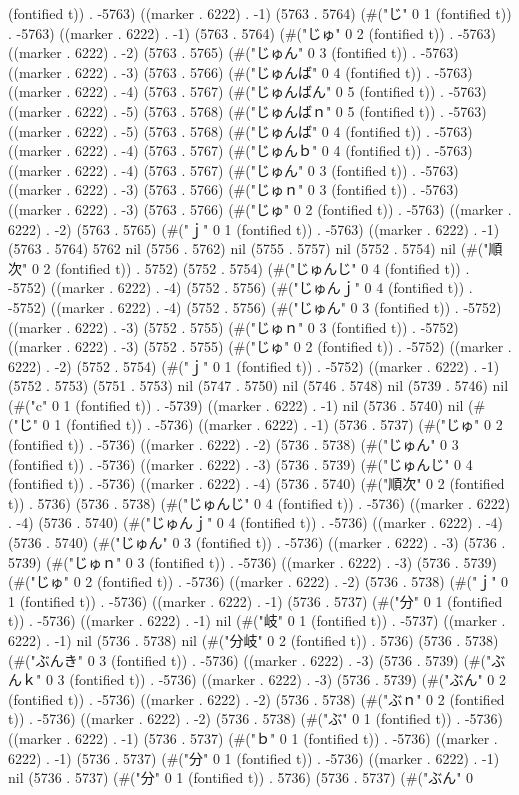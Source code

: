 {(fontified t)) . -5763) ((marker . 6222) . -1) (5763 . 5764) (#("じ" 0 1 (fontified t)) . -5763) ((marker . 6222) . -1) (5763 . 5764) (#("じゅ" 0 2 (fontified t)) . -5763) ((marker . 6222) . -2) (5763 . 5765) (#("じゅん" 0 3 (fontified t)) . -5763) ((marker . 6222) . -3) (5763 . 5766) (#("じゅんば" 0 4 (fontified t)) . -5763) ((marker . 6222) . -4) (5763 . 5767) (#("じゅんばん" 0 5 (fontified t)) . -5763) ((marker . 6222) . -5) (5763 . 5768) (#("じゅんばｎ" 0 5 (fontified t)) . -5763) ((marker . 6222) . -5) (5763 . 5768) (#("じゅんば" 0 4 (fontified t)) . -5763) ((marker . 6222) . -4) (5763 . 5767) (#("じゅんｂ" 0 4 (fontified t)) . -5763) ((marker . 6222) . -4) (5763 . 5767) (#("じゅん" 0 3 (fontified t)) . -5763) ((marker . 6222) . -3) (5763 . 5766) (#("じゅｎ" 0 3 (fontified t)) . -5763) ((marker . 6222) . -3) (5763 . 5766) (#("じゅ" 0 2 (fontified t)) . -5763) ((marker . 6222) . -2) (5763 . 5765) (#("ｊ" 0 1 (fontified t)) . -5763) ((marker . 6222) . -1) (5763 . 5764) 5762 nil (5756 . 5762) nil (5755 . 5757) nil (5752 . 5754) nil (#("順次" 0 2 (fontified t)) . 5752) (5752 . 5754) (#("じゅんじ" 0 4 (fontified t)) . -5752) ((marker . 6222) . -4) (5752 . 5756) (#("じゅんｊ" 0 4 (fontified t)) . -5752) ((marker . 6222) . -4) (5752 . 5756) (#("じゅん" 0 3 (fontified t)) . -5752) ((marker . 6222) . -3) (5752 . 5755) (#("じゅｎ" 0 3 (fontified t)) . -5752) ((marker . 6222) . -3) (5752 . 5755) (#("じゅ" 0 2 (fontified t)) . -5752) ((marker . 6222) . -2) (5752 . 5754) (#("ｊ" 0 1 (fontified t)) . -5752) ((marker . 6222) . -1) (5752 . 5753) (5751 . 5753) nil (5747 . 5750) nil (5746 . 5748) nil (5739 . 5746) nil (#("c" 0 1 (fontified t)) . -5739) ((marker . 6222) . -1) nil (5736 . 5740) nil (#("じ" 0 1 (fontified t)) . -5736) ((marker . 6222) . -1) (5736 . 5737) (#("じゅ" 0 2 (fontified t)) . -5736) ((marker . 6222) . -2) (5736 . 5738) (#("じゅん" 0 3 (fontified t)) . -5736) ((marker . 6222) . -3) (5736 . 5739) (#("じゅんじ" 0 4 (fontified t)) . -5736) ((marker . 6222) . -4) (5736 . 5740) (#("順次" 0 2 (fontified t)) . 5736) (5736 . 5738) (#("じゅんじ" 0 4 (fontified t)) . -5736) ((marker . 6222) . -4) (5736 . 5740) (#("じゅんｊ" 0 4 (fontified t)) . -5736) ((marker . 6222) . -4) (5736 . 5740) (#("じゅん" 0 3 (fontified t)) . -5736) ((marker . 6222) . -3) (5736 . 5739) (#("じゅｎ" 0 3 (fontified t)) . -5736) ((marker . 6222) . -3) (5736 . 5739) (#("じゅ" 0 2 (fontified t)) . -5736) ((marker . 6222) . -2) (5736 . 5738) (#("ｊ" 0 1 (fontified t)) . -5736) ((marker . 6222) . -1) (5736 . 5737) (#("分" 0 1 (fontified t)) . -5736) ((marker . 6222) . -1) nil (#("岐" 0 1 (fontified t)) . -5737) ((marker . 6222) . -1) nil (5736 . 5738) nil (#("分岐" 0 2 (fontified t)) . 5736) (5736 . 5738) (#("ぶんき" 0 3 (fontified t)) . -5736) ((marker . 6222) . -3) (5736 . 5739) (#("ぶんｋ" 0 3 (fontified t)) . -5736) ((marker . 6222) . -3) (5736 . 5739) (#("ぶん" 0 2 (fontified t)) . -5736) ((marker . 6222) . -2) (5736 . 5738) (#("ぶｎ" 0 2 (fontified t)) . -5736) ((marker . 6222) . -2) (5736 . 5738) (#("ぶ" 0 1 (fontified t)) . -5736) ((marker . 6222) . -1) (5736 . 5737) (#("ｂ" 0 1 (fontified t)) . -5736) ((marker . 6222) . -1) (5736 . 5737) (#("分" 0 1 (fontified t)) . -5736) ((marker . 6222) . -1) nil (5736 . 5737) (#("分" 0 1 (fontified t)) . 5736) (5736 . 5737) (#("ぶん" 0 }
